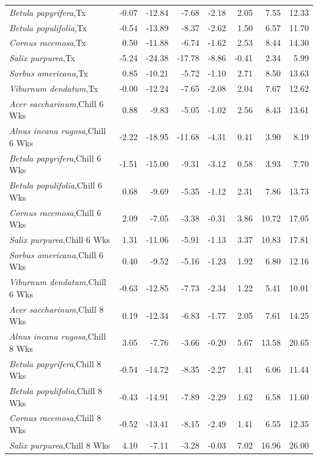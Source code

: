 \documentclass{article}\usepackage[]{graphicx}\usepackage[]{color}
\begin{document}
\begin{longtable}{lrrrrrrr}
  \textit{Betula papyrifera},Tx & -0.07 & -12.84 & -7.68 & -2.18 & 2.05 & 7.55 & 12.33 \\ 
  \textit{Betula populifolia},Tx & -0.54 & -13.89 & -8.37 & -2.62 & 1.50 & 6.57 & 11.70 \\ 
  \textit{Cornus racemosa},Tx & 0.50 & -11.88 & -6.74 & -1.62 & 2.53 & 8.44 & 14.30 \\ 
  \textit{Salix purpurea},Tx & -5.24 & -24.38 & -17.78 & -8.86 & -0.41 & 2.34 & 5.99 \\ 
  \textit{Sorbus americana},Tx & 0.85 & -10.21 & -5.72 & -1.10 & 2.71 & 8.50 & 13.63 \\ 
  \textit{Viburnum dendatum},Tx & -0.00 & -12.24 & -7.65 & -2.08 & 2.04 & 7.67 & 12.62 \\ 
  \textit{Acer saccharinum},Chill 6 Wks & 0.88 & -9.83 & -5.05 & -1.02 & 2.56 & 8.43 & 13.61 \\ 
  \textit{Alnus incana rugosa},Chill 6 Wks & -2.22 & -18.95 & -11.68 & -4.31 & 0.41 & 3.90 & 8.19 \\ 
  \textit{Betula papyrifera},Chill 6 Wks & -1.51 & -15.00 & -9.31 & -3.12 & 0.58 & 3.93 & 7.70 \\ 
  \textit{Betula populifolia},Chill 6 Wks & 0.68 & -9.69 & -5.35 & -1.12 & 2.31 & 7.86 & 13.73 \\ 
  \textit{Cornus racemosa},Chill 6 Wks & 2.09 & -7.05 & -3.38 & -0.31 & 3.86 & 10.72 & 17.05 \\ 
  \textit{Salix purpurea},Chill 6 Wks & 1.31 & -11.06 & -5.91 & -1.13 & 3.37 & 10.83 & 17.81 \\ 
  \textit{Sorbus americana},Chill 6 Wks & 0.40 & -9.52 & -5.16 & -1.23 & 1.92 & 6.80 & 12.16 \\ 
  \textit{Viburnum dendatum},Chill 6 Wks & -0.63 & -12.85 & -7.73 & -2.34 & 1.22 & 5.41 & 10.01 \\ 
  \textit{Acer saccharinum},Chill 8 Wks & 0.19 & -12.34 & -6.83 & -1.77 & 2.05 & 7.61 & 14.25 \\ 
  \textit{Alnus incana rugosa},Chill 8 Wks & 3.05 & -7.76 & -3.66 & -0.20 & 5.67 & 13.58 & 20.65 \\ 
  \textit{Betula papyrifera},Chill 8 Wks & -0.54 & -14.72 & -8.35 & -2.27 & 1.41 & 6.06 & 11.44 \\ 
  \textit{Betula populifolia},Chill 8 Wks & -0.43 & -14.91 & -7.89 & -2.29 & 1.62 & 6.58 & 11.60 \\ 
  \textit{Cornus racemosa},Chill 8 Wks & -0.52 & -13.41 & -8.15 & -2.49 & 1.41 & 6.55 & 12.35 \\ 
  \textit{Salix purpurea},Chill 8 Wks & 4.10 & -7.11 & -3.28 & -0.03 & 7.02 & 16.96 & 26.00 \\ 

\end{longtable}
\end{document}
